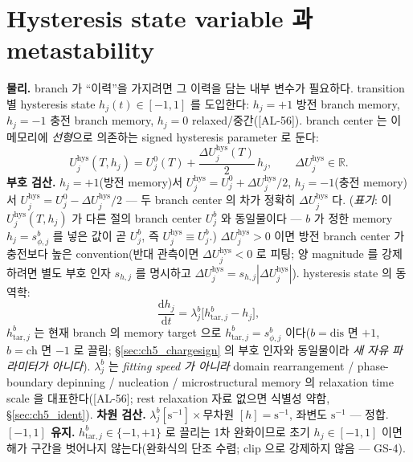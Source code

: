\documentclass[11pt,a4paper]{article}
\newcommand{\dd}{\mathrm{d}}
\newcommand{\dis}{\mathrm{dis}}
\newcommand{\chg}{\mathrm{ch}}
\newcommand{\hys}{\mathrm{hys}}
\newcommand{\tar}{\mathrm{tar}}
\newcommand{\AL}[1]{\textsf{[AL-#1]}}
\begin{document}
\section{Hysteresis state variable 과 metastability}\label{sec:ch5_hstate}
\textbf{물리.} branch 가 ``이력''을 가지려면 그 이력을 담는 내부 변수가 필요하다. transition 별 hysteresis state
$h_j(t)\in[-1,1]$ 를 도입한다: $h_j=+1$ 방전 branch memory, $h_j=-1$ 충전 branch memory, $h_j=0$
relaxed/중간(\AL{56}). branch center 는 이 메모리에 \emph{선형}으로 의존하는 signed hysteresis parameter 로
둔다:
\begin{equation}
U_j^\hys(T,h_j)=U_j^0(T)+\frac{\Delta U_j^\hys(T)}{2}\,h_j,\qquad \Delta U_j^\hys\in\mathbb R.
\label{eq:ch5_hys_center}
\end{equation}
\textbf{부호 검산.} $h_j=+1$(방전 memory)서 $U_j^\hys=U_j^0+\Delta U_j^\hys/2$, $h_j=-1$(충전 memory)서
$U_j^\hys=U_j^0-\Delta U_j^\hys/2$ — 두 branch center 의 차가 정확히 $\Delta U_j^\hys$ 다. (\emph{표기}: 이
$U_j^\hys(T,h_j)$ 가 다른 절의 branch center $U_j^b$ 와 동일물이다 — $b$ 가 정한 memory $h_j=s_{\phi,j}^b$ 를
넣은 값이 곧 $U_j^b$, 즉 $U_j^\hys\equiv U_j^b$.)
$\Delta U_j^\hys>0$ 이면 방전 branch center 가 충전보다 높은 convention(반대 관측이면 $\Delta U_j^\hys<0$ 로
피팅; 양 magnitude 를 강제하려면 별도 부호 인자 $s_{h,j}$ 를 명시하고 $\Delta U_j^\hys=s_{h,j}|\Delta U_j^\hys|$).
hysteresis state 의 동역학:
\begin{equation}
\frac{\dd h_j}{\dd t}=\lambda_j^b\big[h_{\tar,j}^b-h_j\big],
\label{eq:ch5_h_dyn}
\end{equation}
$h_{\tar,j}^b$ 는 현재 branch 의 memory target 으로 $h_{\tar,j}^b=s_{\phi,j}^b$ 이다($b=\dis$ 면 $+1$, $b=\chg$ 면
$-1$ 로 끌림; \S\ref{sec:ch5_chargesign} 의 부호 인자와 동일물이라 \emph{새 자유 파라미터가 아니다}). $\lambda_j^b$
는 \emph{fitting speed 가 아니라} domain rearrangement / phase-boundary depinning / nucleation /
microstructural memory 의 relaxation time scale 을 대표한다(\AL{56}; rest relaxation 자료 없으면 식별성 약함,
\S\ref{sec:ch5_ident}). \textbf{차원 검산.} $\lambda_j^b[\mathrm{s^{-1}}]\times$무차원 $[h]=\mathrm{s^{-1}}$,
좌변도 $\mathrm{s^{-1}}$ — 정합. \textbf{$[-1,1]$ 유지.} $h_{\tar,j}^b\in\{-1,+1\}$ 로 끌리는 1차 완화이므로
초기 $h_j\in[-1,1]$ 이면 해가 구간을 벗어나지 않는다(완화식의 단조 수렴; clip 으로 강제하지 않음 — GS-4).

\end{document}
